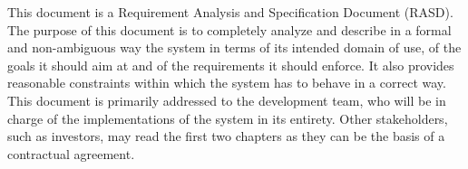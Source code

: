 This document is a Requirement Analysis and Specification Document (RASD).
The purpose of this document is to completely analyze and describe in a formal and non-ambiguous way the system in terms of its intended domain of use, of the goals it should aim at and of the requirements it should enforce. It also provides reasonable constraints within which the system has to behave in a correct way.
This document is primarily addressed to the development team, who will be in charge of the implementations of the system in its entirety. Other stakeholders, such as investors, may read the first two chapters as they can be the basis of a contractual agreement.